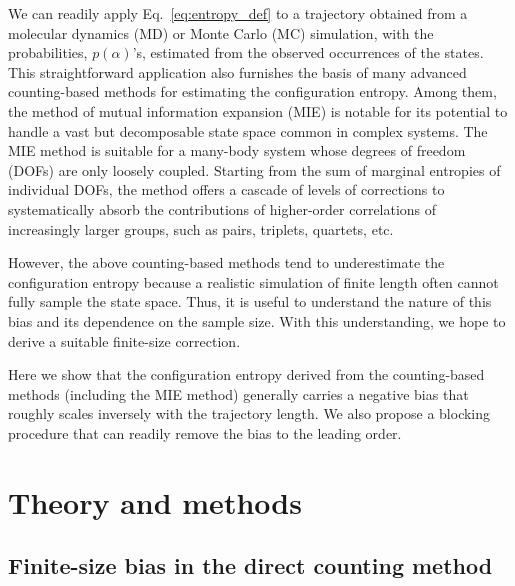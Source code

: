 \documentclass[reprint, superscriptaddress]{revtex4-1}
\begin{document}
We can readily apply Eq.~\eqref{eq:entropy_def} to a trajectory
obtained from a molecular dynamics (MD) or Monte Carlo (MC) simulation,
with the probabilities, $p(\alpha)$'s,
estimated from the observed occurrences of the states.
%
This straightforward application also furnishes the basis
of many advanced counting-based methods for estimating
the configuration entropy\cite{hnizdo2007, killian2007}.
%
Among them, the method of mutual information expansion (MIE)\cite{killian2007} is notable
for its potential to handle a vast but decomposable state space common in complex systems.
%
The MIE method is suitable for a many-body system
whose degrees of freedom (DOFs) are only loosely coupled.
%
Starting from the sum of marginal entropies of individual DOFs,
the method offers a cascade of levels of corrections
to systematically absorb the contributions of higher-order correlations
of increasingly larger groups, such as pairs, triplets, quartets, etc.

However, the above counting-based methods
tend to underestimate the configuration entropy
because a realistic simulation of finite length
often cannot fully sample the state space.
%
Thus, it is useful to understand the nature of this bias
and its dependence on the sample size.
%
With this understanding,
we hope to derive a suitable finite-size correction.

Here we show that the configuration entropy derived
from the counting-based methods (including the MIE method)
generally carries a negative bias
that roughly scales inversely with the trajectory length.
%
We also propose a blocking procedure
that can readily remove the bias
to the leading order.
%
%



\section{Theory and methods}

\subsection{\label{sec:fsbias}
Finite-size bias in the direct counting method}
\end{document}
